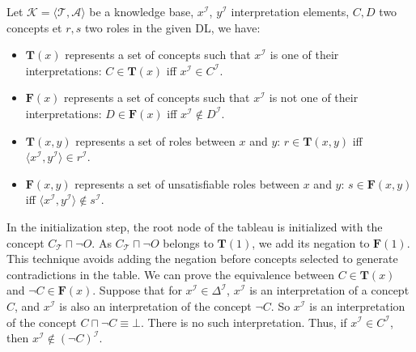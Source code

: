 \documentclass{article}
\begin{document}
 Let $\mathcal{K}=\langle \mathcal{T},\mathcal{A}\rangle$ be a knowledge base,  $x^{\mathcal{I}}$, $y^{\mathcal{I}}$ interpretation elements, $C,D$  two concepts et $r, s$ two roles in the given DL,
 we have:
 \begin{itemize}
 \item   $\mathbf{T}(x)$ represents a set of concepts such that $x^\mathcal{I}$ is one of their interpretations:
   $C\in \mathbf{T}(x)$ iff $x^\mathcal{I} \in C^\mathcal{I}$.
 \item   $\mathbf{F}(x)$ represents a set of concepts such that $x^\mathcal{I}$ is not one of their interpretations:
  $D\in \mathbf{F}(x)$ iff $x^\mathcal{I} \notin D^\mathcal{I}$.
 \item   $\mathbf{T}(x,y)$ represents a set of roles between $x$ and $y$:
  $r\in \mathbf{T}(x,y)$ iff $\langle x^\mathcal{I}, y^\mathcal{I} \rangle \in r^\mathcal{I}$.
 \item   $\mathbf{F}(x,y)$ represents a set of unsatisfiable roles between $x$ and $y$:
  $s\in \mathbf{F}(x,y)$ iff $\langle x^\mathcal{I}, y^\mathcal{I} \rangle \notin s^\mathcal{I}$.
 \end{itemize}
 
 In the initialization step, the root node of the tableau is initialized with the concept $C_\mathcal{T}\sqcap \neg O$.
 As $C_\mathcal{T}\sqcap \neg O$ belongs to $\mathbf{T}(1)$, we add its negation to $\mathbf{F}(1)$.
 This technique avoids adding the negation before concepts selected to generate contradictions in the table.
 We can prove the equivalence between $ C\in \mathbf{T}(x) $ and $\neg C \in \mathbf {F}(x)$. Suppose that for $x^\mathcal{I} \in \Delta^\mathcal{I}$, $x^\mathcal{I}$ is an interpretation of a concept $C$,
and $x^\mathcal{I}$ is also an interpretation of the concept $\neg C$. So $x^\mathcal{I}$ is an interpretation of the concept $C\sqcap\neg C\equiv \bot$. There is no such interpretation.
Thus, if $x^\mathcal{I}\in C^\mathcal{I}$, then $x^\mathcal{I} \notin(\neg C)^\mathcal{I}$.
 
\end{document}
